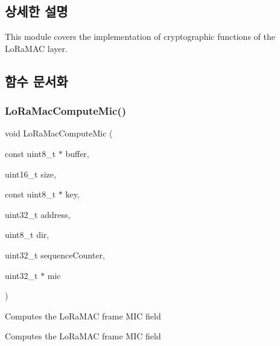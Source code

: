 \subsection{상세한 설명}
This module covers the implementation of cryptographic functions of the Lo\+Ra\+M\+AC layer. 

\subsection{함수 문서화}
\mbox{\label{group___l_o_r_a_m_a_c___c_r_y_p_t_o_ga6ee265070494b83255e7fdc4dff985da}} 
\subsubsection{\texorpdfstring{Lo\+Ra\+Mac\+Compute\+Mic()}{LoRaMacComputeMic()}}
{\footnotesize\ttfamily void Lo\+Ra\+Mac\+Compute\+Mic (\begin{DoxyParamCaption}\item[{const uint8\+\_\+t $\ast$}]{buffer,  }\item[{uint16\+\_\+t}]{size,  }\item[{const uint8\+\_\+t $\ast$}]{key,  }\item[{uint32\+\_\+t}]{address,  }\item[{uint8\+\_\+t}]{dir,  }\item[{uint32\+\_\+t}]{sequence\+Counter,  }\item[{uint32\+\_\+t $\ast$}]{mic }\end{DoxyParamCaption})}



Computes the Lo\+Ra\+M\+AC frame M\+IC field 

Computes the Lo\+Ra\+M\+AC frame M\+IC field


